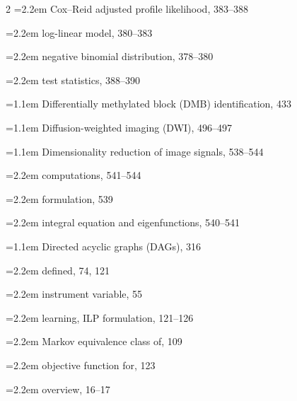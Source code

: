 \begin{multicols}{2}
\noindent\hangindent=2.2em \hspace*{1.1em}Cox--Reid adjusted profile likelihood, 383--388\par
\noindent\hangindent=2.2em \hspace*{1.1em}log-linear model, 380--383\par
\noindent\hangindent=2.2em \hspace*{1.1em}negative binomial distribution, 378--380\par
\noindent\hangindent=2.2em \hspace*{1.1em}test statistics, 388--390\par
\noindent\hangindent=1.1em Differentially methylated block (DMB) identification, 433\par
\noindent\hangindent=1.1em Diffusion-weighted imaging (DWI), 496--497\par
\noindent\hangindent=1.1em Dimensionality reduction of image signals, 538--544\par
\noindent\hangindent=2.2em \hspace*{1.1em}computations, 541--544\par
\noindent\hangindent=2.2em \hspace*{1.1em}formulation, 539\par
\noindent\hangindent=2.2em \hspace*{1.1em}integral equation and eigenfunctions, 540--541\par
\noindent\hangindent=1.1em Directed acyclic graphs (DAGs), 316\par
\noindent\hangindent=2.2em \hspace*{1.1em}defined, 74, 121\par
\noindent\hangindent=2.2em \hspace*{1.1em}instrument variable, 55\par
\noindent\hangindent=2.2em \hspace*{1.1em}learning, ILP formulation, 121--126\par
\noindent\hangindent=2.2em \hspace*{1.1em}Markov equivalence class of, 109\par
\noindent\hangindent=2.2em \hspace*{1.1em}objective function for, 123\par
\noindent\hangindent=2.2em \hspace*{1.1em}overview, 16--17\par

\end{multicols}
